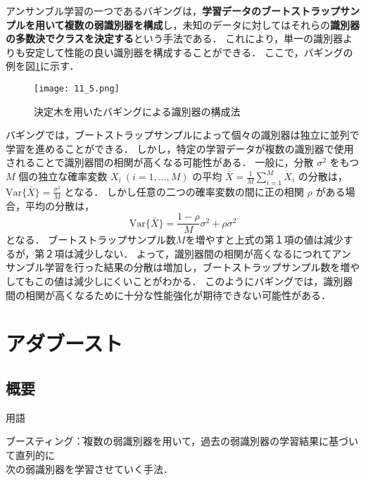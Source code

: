 \documentclass[dvipdfmx]{jreport}
\begin{document}
アンサンブル学習の一つであるバギングは，\textbf{学習データのブートストラップサンプルを用いて複数の弱識別器を構成}し，未知のデータに対してはそれらの\textbf{識別器の多数決でクラスを決定する}という手法である．
これにより，単一の識別器よりも安定して性能の良い識別器を構成することができる．
ここで，バギングの例を図\ref{fig:5}に示す．
\begin{figure}[h]
    \begin{center}
        \texttt{[image: 11\_5.png]}
        \caption{決定木を用いたバギングによる識別器の構成法}\label{fig:5}
    \end{center}
\end{figure}

バギングでは，ブートストラップサンプルによって個々の識別器は独立に並列で学習を進めることができる．
しかし，特定の学習データが複数の識別器で使用されることで識別器間の相関が高くなる可能性がある．
一般に，分散 $\sigma^2$ をもつ $M$ 個の独立な確率変数 $X_i\ (i = 1, \dots, M)$ の平均 $\bar{X} = \frac{1}{M} \sum_{i=1}^{M} X_i$ の分散は，$\mathrm{Var}\{\bar{X}\} = \frac{\sigma^2}{M}$
となる．
しかし任意の二つの確率変数の間に正の相関 $\rho$ がある場合，平均の分散は，
\begin{equation}
    \mathrm{Var}\{\bar{X}\} = \frac{1-\rho}{M}\sigma^2 + \rho\sigma^2 \label{eq:19}
\end{equation}
となる．
ブートストラップサンプル数$M$を増やすと上式の第１項の値は減少するが，第２項は減少しない．
よって，識別器間の相関が高くなるにつれてアンサンブル学習を行った結果の分散は増加し，ブートストラップサンプル数を増やしてもこの値は減少しにくいことがわかる．
このようにバギングでは，識別器間の相関が高くなるために十分な性能強化が期待できない可能性がある．


\section{アダブースト}
\subsection{概要}
\begin{itembox}[l]{\large{用語}}
    \begin{tabbing}
        \hspace{15pt} \raisebox{0.5ex}{\tiny $\bullet$} ブースティング\hspace{3pt}\=：複数の弱識別器を用いて，過去の弱識別器の学習結果に基づいて直列的に\\[0.5em]\>\hspace{6.5pt}次の弱識別器を学習させていく手法．
    \end{tabbing}
\end{itembox}
\end{document}
